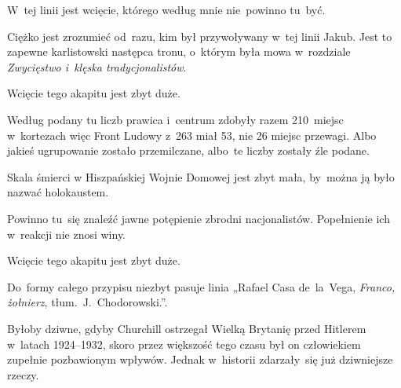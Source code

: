\documentclass[a4paper,11pt]{article}
\begin{document}
\start {} W~tej linii jest wcięcie, którego według mnie
nie~powinno tu~być.

\vspace{\spaceFour}


\start {} Ciężko jest zrozumieć od~razu, kim był
przywoływany w~tej linii Jakub. Jest to zapewne karlistowski następca
tronu, o~którym była mowa w~rozdziale \emph{Zwycięstwo i~klęska
  tradycjonalistów}. 

\vspace{\spaceFour}


\start {} Wcięcie tego akapitu jest zbyt duże.

\vspace{\spaceFour}


\start {} Według podany tu liczb prawica i~centrum zdobyły
razem 210~miejsc w~kortezach więc Front Ludowy z~263 miał 53, nie 26
miejsc przewagi. Albo jakieś ugrupowanie zostało przemilczane, albo~te
liczby zostały źle podane.

\vspace{\spaceFour}


\start {} Skala śmierci w Hiszpańskiej Wojnie Domowej jest
zbyt mała, by~można ją było nazwać holokaustem.

\vspace{\spaceFour}


\start {} Powinno tu~się znaleźć jawne potępienie zbrodni
nacjonalistów. Popełnienie ich w~reakcji nie znosi winy.

\vspace{\spaceFour}


\start {} Wcięcie tego akapitu jest zbyt duże.

\vspace{\spaceFour}


\start {} Do~formy całego przypisu niezbyt pasuje linia
„Rafael Casa de~la~Vega, \emph{Franco, żołnierz},
tłum.~J.~Chodorowski.”.

\vspace{\spaceFour}


\start {} Byłoby dziwne, gdyby Churchill ostrzegał Wielką
Brytanię przed Hitlerem w~latach 1924--1932, skoro przez większość tego
czasu był on człowiekiem zupełnie pozbawionym wpływów. Jednak
w~historii zdarzały~się już dziwniejsze rzeczy.

\vspace{\spaceFour}
\end{document}
